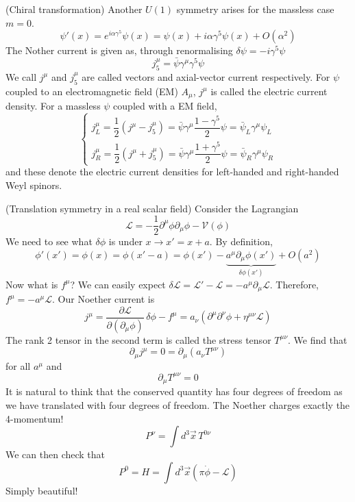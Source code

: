 \begin{ex}
(Chiral transformation) Another $U(1)$ symmetry arises for the massless case $m=0$.
\[\psi '(x)=e^{i\alpha \gamma ^{5}}\psi (x)=\psi (x)+i\alpha \gamma ^{5}\psi (x)+O(\alpha^2)\]
The Nother current is given as, through renormalising $\delta \psi =-i\gamma ^{5}\psi $
\[j^{\mu }_{5}=\bar{\psi }\gamma ^{\mu }\gamma ^{5}\psi \]
We call $j^{\mu }$ and $j^{\mu}_{5}$ are called vectors and axial-vector current respectively. For $\psi $ coupled to an electromagnetic field (EM) $A_{\mu }$, $j^{\mu }$ is called the electric current density. For a massless $\psi $ coupled with a EM field,
\[\begin{cases}
j^{\mu }_{L}=\dfrac{1}{2}(j^{\mu }-j_{5}^{\mu })=\bar{\psi }\gamma ^{\mu }\dfrac{1-\gamma ^{5}}{2}\psi =\bar{\psi }_{L}\gamma ^{\mu }\psi _{L}\\
j^{\mu }_{R}=\dfrac{1}{2}(j^{\mu }+j^{\mu }_{5})=\bar{\psi }\gamma ^{\mu }\dfrac{1+\gamma ^{5}}{2}\psi =\bar{\psi }_{R}\gamma ^{\mu }\psi _{R}
\end{cases}\]
and these denote the electric current densities for left-handed and right-handed Weyl spinors. 
\end{ex}
\vspace{2ex}
\begin{ex}
(Translation symmetry in a real scalar field) Consider the Lagrangian
\[\mathcal{L}=-\dfrac{1}{2}\partial ^{\mu }\phi \partial _{\mu }\phi -\mathcal{V}(\phi )\]
We need to see what $\delta \phi $ is under $x\rightarrow x'=x+a$. By definition, 
\[\phi '(x')=\phi (x)=\phi (x'-a)=\phi (x')-\underbrace{a^{\mu }\partial _{\mu }\phi (x')}_{\delta \phi (x')}+O(a^2)\]
Now what is $f^{\mu }$? We can easily expect $\delta \mathcal{L}=\mathcal{L}'-\mathcal{L}=-a^{\mu }\partial _{\mu }\mathcal{L}$. Therefore, $f^{\mu }=-a^{\mu }\mathcal{L}$. Our Noether current is
\[j^{\mu }=\dfrac{\partial \mathcal{L}}{\partial (\partial _{\mu }\phi )}\,\delta \phi -f^{\mu }=a_{\nu }(\partial ^{\mu }\partial ^{\nu }\phi +\eta ^{\mu \nu }\mathcal{L}) \]
The rank 2 tensor in the second term is called the stress tensor $T^{\mu \nu }$. We find that
\[\partial _{\mu }j^{\mu }=0=\partial _{\mu }(a_{\nu }T^{\mu \nu })\]
for all $a^{\mu }$ and 
\[\partial _{\mu }T^{\mu \nu }=0\]
It is natural to think that the conserved quantity has four degrees of freedom as we have translated with four degrees of freedom. The Noether charges exactly the 4-momentum!
\[P^{\nu }=\int d^3\vec{x}\,T^{0\nu }\]
We can then check that
\[P^{0}=H=\int d^3\vec{x}(\pi \dot{\phi }-\mathcal{L})\]
Simply beautiful!
\end{ex}
